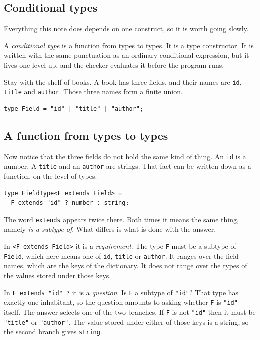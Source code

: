 \documentclass[11pt,a4paper]{article}
\begin{document}
\begin{pinkbox}
\section{Conditional types}
\label{sec:cond}

Everything this note does depends on one construct, so it is worth going slowly.

A \emph{conditional type} is a function from types to types. It is a type constructor. It is
written with the same punctuation as an ordinary conditional expression, but it lives one level
up, and the checker evaluates it before the program runs.

Stay with the shelf of books. A book has three fields, and their names are \texttt{id},
\texttt{title} and \texttt{author}. Those three names form a finite union.

\begin{lstlisting}[language=TS]
type Field = "id" | "title" | "author";
\end{lstlisting}

\subsection{A function from types to types}

Now notice that the three fields do not hold the same kind of thing. An \texttt{id} is a number.
A \texttt{title} and an \texttt{author} are strings. That fact can be written down as a function,
on the level of types.

\begin{lstlisting}[language=TS]
type FieldType<F extends Field> =
  F extends "id" ? number : string;
\end{lstlisting}

The word \texttt{extends} appears twice there. Both times it means the same thing, namely
\emph{is a subtype of}. What differs is what is done with the answer.

In \texttt{<F extends Field>} it is a \emph{requirement}. The type \texttt{F} must be a subtype of
\texttt{Field}, which here means one of \texttt{id}, \texttt{title} or \texttt{author}. It ranges
over the field names, which are the keys of the dictionary. It does not range over the types of the
values stored under those keys.

In \texttt{F extends "id" ?} it is a \emph{question}. Is \texttt{F} a subtype of \texttt{"id"}?
That type has exactly one inhabitant, so the question amounts to asking whether \texttt{F} is
\texttt{"id"} itself. The answer selects one of the two branches. If \texttt{F} is not
\texttt{"id"} then it must be \texttt{"title"} or \texttt{"author"}. The value stored under either
of those keys is a string, so the second branch gives \texttt{string}.


\end{pinkbox}
\end{document}
